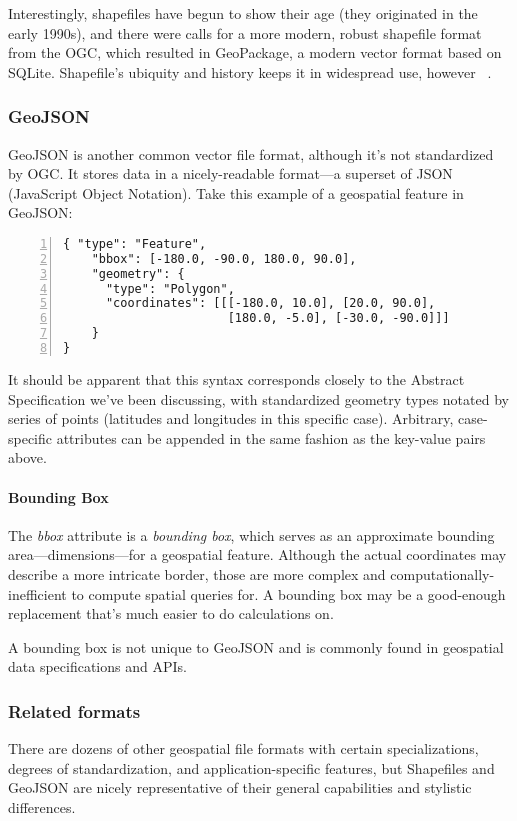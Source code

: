 Interestingly, shapefiles have begun to show their age (they originated in the early 1990s), and there were calls for a more modern, robust shapefile format from the OGC, which resulted in GeoPackage, a modern vector format based on SQLite. Shapefile's ubiquity and history keeps it in widespread use, however ~\cite{slashgeo,GeoPackage}.

\subsubsection{GeoJSON}
GeoJSON is another common vector file format, although it's not standardized by OGC. It stores data in a nicely-readable format---a superset of JSON (JavaScript Object Notation). Take this example of a geospatial feature in GeoJSON:

\begin{Verbatim}[samepage=true,baselinestretch=1,numbers=left,xleftmargin=12mm]
{ "type": "Feature",
    "bbox": [-180.0, -90.0, 180.0, 90.0],
    "geometry": {
      "type": "Polygon",
      "coordinates": [[[-180.0, 10.0], [20.0, 90.0],
                       [180.0, -5.0], [-30.0, -90.0]]]
    }
}
\end{Verbatim}

It should be apparent that this syntax corresponds closely to the Abstract Specification we've been discussing, with standardized geometry types notated by series of points (latitudes and longitudes in this specific case). Arbitrary, case-specific attributes can be appended in the same fashion as the key-value pairs above.

\paragraph{Bounding Box}
The \textit{bbox} attribute is a \textit{bounding box}, which serves as an approximate bounding area---dimensions---for a geospatial feature. Although the actual coordinates may describe a more intricate border, those are more complex and computationally-inefficient to compute spatial queries for. A bounding box may be a good-enough replacement that's much easier to do calculations on.

A bounding box is not unique to GeoJSON and is commonly found in geospatial data specifications and APIs.

\subsubsection{Related formats}
There are dozens of other geospatial file formats with certain specializations, degrees of standardization, and application-specific features, but Shapefiles and GeoJSON are nicely representative of their general capabilities and stylistic differences.